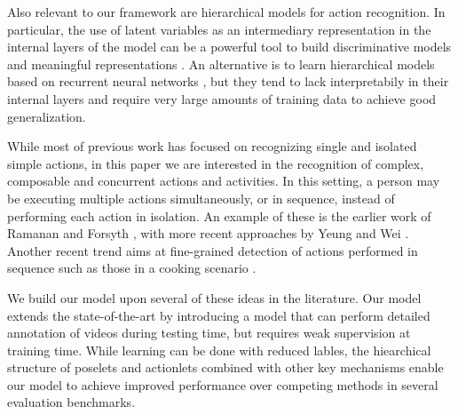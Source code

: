 Also relevant to our framework are hierarchical models for action
recognition. In particular, the use of latent variables as an intermediary
representation in the internal layers of the model can be a powerful
tool to build discriminative models and meaningful representations
\cite{Hu2014, Wang2008}. An alternative is to learn hierarchical models
based on recurrent neural networks \cite{YongDu2015}, but they tend to lack
interpretabily in their internal layers and require very large amounts
of training data to achieve good generalization.


While most of previous work has focused on recognizing single and isolated
simple actions, in this paper we are interested in the recognition
of complex, composable \cite{Lillo2014} and concurrent \cite{Wei2013} actions
and activities. In this setting, a person may be executing multiple actions
simultaneously, or in sequence, instead of performing each action in isolation.
An example of these is the earlier work of Ramanan and Forsyth \cite{Ramanan2003},
with more recent approaches by Yeung \etal \cite{Yeung2015} and
Wei \etal \cite{Wei2013}.
Another recent trend aims at fine-grained detection of actions performed in sequence
such as those in a cooking scenario \cite{Rohrbach2012, Lan2015}.

We build our model upon several of these ideas in the literature. Our model
extends the state-of-the-art by introducing a model that can perform
detailed annotation of videos during testing time, but requires weak
supervision at training time. While learning can be done with
reduced lables, the hiearchical structure of poselets and actionlets combined
with other key mechanisms enable our model to achieve improved
performance over competing methods in several evaluation benchmarks.
